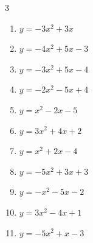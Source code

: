 \begin{multicols}{3}
\begin{enumerate}
  \item $\displaystyle y=-3x^{2}+3x$


  \item $\displaystyle y=-4x^{2}+5x-3$


  \item $\displaystyle y=-3x^{2}+5x-4$


  \item $\displaystyle y=-2x^{2}-5x+4$


\columnbreak %

  \item $\displaystyle y=x^{2}-2x-5$

        \phantom{$\displaystyle 頂点\left( 1 , -6 \right)$}

  \item $\displaystyle y=3x^{2}+4x+2$


  \item $\displaystyle y=x^{2}+2x-4$

        \phantom{$\displaystyle 頂点\left( -1 , -5 \right)$}

  \item $\displaystyle y=-5x^{2}+3x+3$


  \item $\displaystyle y=-x^{2}-5x-2$


\columnbreak %

\resetques

  \item $\displaystyle y=3x^{2}-4x+1$


  \item $\displaystyle y=-5x^{2}+x-3$


\end{enumerate}
\end{multicols}
